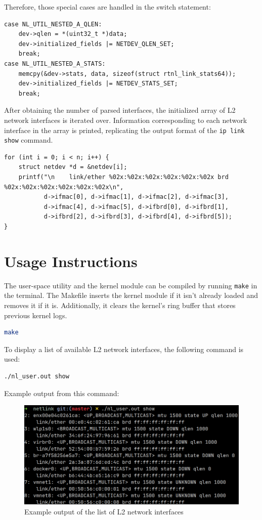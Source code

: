 \documentclass[10pt, letterpaper]{article}
\begin{document}
Therefore, those special cases are handled in the switch statement:
\begin{lstlisting}[caption={Special cases in the switch statement}]
case NL_UTIL_NESTED_A_QLEN:
    dev->qlen = *(uint32_t *)data;
    dev->initialized_fields |= NETDEV_QLEN_SET;
    break;
case NL_UTIL_NESTED_A_STATS:
    memcpy(&dev->stats, data, sizeof(struct rtnl_link_stats64));
    dev->initialized_fields |= NETDEV_STATS_SET;
    break;
\end{lstlisting}

After obtaining the number of parsed interfaces, the initialized array of L2 network
interfaces is iterated over. Information corresponding to each network interface in the
array is printed, replicating the output format of the \texttt{ip link show} command.
\begin{lstlisting}[caption={Example of printing a MAC address}]
for (int i = 0; i < n; i++) {
    struct netdev *d = &netdev[i];
    printf("\n    link/ether %02x:%02x:%02x:%02x:%02x:%02x brd %02x:%02x:%02x:%02x:%02x:%02x\n",
           d->ifmac[0], d->ifmac[1], d->ifmac[2], d->ifmac[3],
           d->ifmac[4], d->ifmac[5], d->ifbrd[0], d->ifbrd[1],
           d->ifbrd[2], d->ifbrd[3], d->ifbrd[4], d->ifbrd[5]);
}
\end{lstlisting}

\section{Usage Instructions}
The user-space utility and the kernel module can be compiled by running \texttt{make} in
the terminal. The Makefile inserts the kernel module if it isn't already loaded and
removes it if it is. Additionally, it clears the kernel's ring buffer that stores previous
kernel logs.
\begin{lstlisting}[language={Bash}, caption={Compiling the kernel module and the user-space utility}]
make
\end{lstlisting}

To display a list of available L2 network interfaces, the following command is used:
\begin{lstlisting}[language={Bash}, caption={Listing L2 network interfaces}]
./nl_user.out show
\end{lstlisting}

Example output from this command:
\begin{figure}[ht]
	\centering
	\includegraphics[width=1\textwidth]{./images/show_output.png}
	\caption{Example output of the list of L2 network interfaces}
\end{figure}
\end{document}
